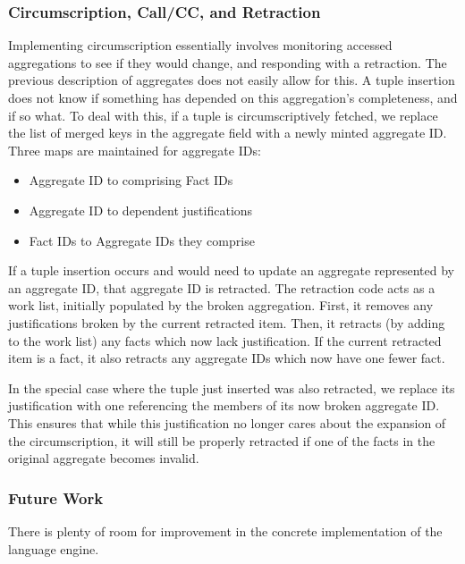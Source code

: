 \subsubsection{Circumscription, Call/CC, and Retraction}
Implementing circumscription essentially involves monitoring accessed aggregations to see if they would change, and responding with a retraction.
The previous description of aggregates does not easily allow for this.
A tuple insertion does not know if something has depended on this aggregation's completeness, and if so what.
To deal with this, if a tuple is circumscriptively fetched, we replace the list of merged keys in the aggregate field with a newly minted aggregate ID.
Three maps are maintained for aggregate IDs:
\begin{itemize}
	\item Aggregate ID to comprising Fact IDs
	\item Aggregate ID to dependent justifications
	\item Fact IDs to Aggregate IDs they comprise
\end{itemize}

If a tuple insertion occurs and would need to update an aggregate represented by an aggregate ID, that aggregate ID is retracted.
The retraction code acts as a work list, initially populated by the broken aggregation.
First, it removes any justifications broken by the current retracted item.
Then, it retracts (by adding to the work list) any facts which now lack justification.
If the current retracted item is a fact, it also retracts any aggregate IDs which now have one fewer fact.

In the special case where the tuple just inserted was also retracted, we replace its justification with one referencing the members of its now broken aggregate ID.
This ensures that while this justification no longer cares about the expansion of the circumscription, it will still be properly retracted if one of the facts in the original aggregate becomes invalid.


\subsubsection{Future Work}
There is plenty of room for improvement in the concrete implementation of the language engine.

